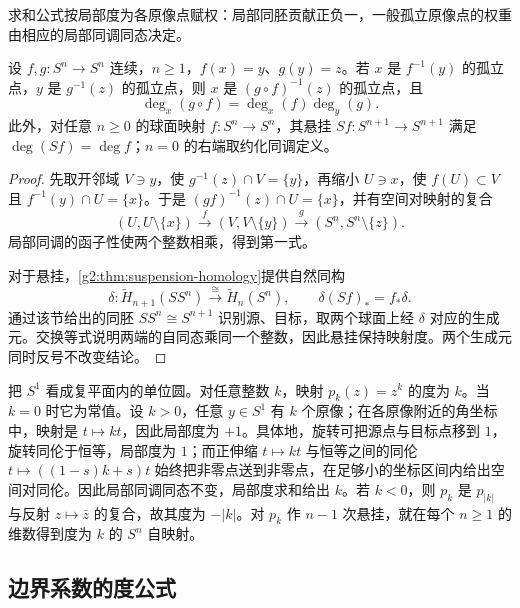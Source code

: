 求和公式按局部度为各原像点赋权：局部同胚贡献正负一，一般孤立原像点的权重由相应的局部同调同态决定。

\begin{proposition}\label{g2:prop:degree-composition-suspension}
	设 \(f,g:S^n\rightarrow S^n\) 连续，\(n\ge1\)，\(f(x)=y\)、\(g(y)=z\)。若 \(x\) 是 \(f^{-1}(y)\) 的孤立点，\(y\) 是 \(g^{-1}(z)\) 的孤立点，则 \(x\) 是 \((g\circ f)^{-1}(z)\) 的孤立点，且
	\[
		\deg_x(g\circ f)=\deg_x(f)\deg_y(g).
	\]
	此外，对任意 \(n\ge0\) 的球面映射 \(f:S^n\rightarrow S^n\)，其悬挂 \(Sf:S^{n+1}\rightarrow S^{n+1}\) 满足 \(\deg(Sf)=\deg f\)；\(n=0\) 的右端取约化同调定义。
\end{proposition}
\begin{proof}
	先取开邻域 \(V\ni y\)，使 \(g^{-1}(z)\cap V=\{y\}\)，再缩小 \(U\ni x\)，使 \(f(U)\subset V\) 且 \(f^{-1}(y)\cap U=\{x\}\)。于是 \((gf)^{-1}(z)\cap U=\{x\}\)，并有空间对映射的复合
	\[
		(U,U\setminus\{x\})\xrightarrow{f}
		(V,V\setminus\{y\})\xrightarrow{g}
		(S^n,S^n\setminus\{z\}).
	\]
	局部同调的函子性使两个整数相乘，得到第一式。

	对于悬挂，\cref{g2:thm:suspension-homology}提供自然同构
	\[
		\delta:\widetilde H_{n+1}(SS^n)\xrightarrow{\cong}\widetilde H_n(S^n),
		\qquad \delta(Sf)_*=f_*\delta.
	\]
	通过该节给出的同胚 \(SS^n\cong S^{n+1}\) 识别源、目标，取两个球面上经 \(\delta\) 对应的生成元。交换等式说明两端的自同态乘同一个整数，因此悬挂保持映射度。两个生成元同时反号不改变结论。
\end{proof}

\begin{example}\label{g2:exm:all-integer-degrees}
	把 \(S^1\) 看成复平面内的单位圆。对任意整数 \(k\)，映射 \(p_k(z)=z^k\) 的度为 \(k\)。当 \(k=0\) 时它为常值。设 \(k>0\)，任意 \(y\in S^1\) 有 \(k\) 个原像；在各原像附近的角坐标中，映射是 \(t\mapsto kt\)，因此局部度为 \(+1\)。具体地，旋转可把源点与目标点移到 \(1\)，旋转同伦于恒等，局部度为 \(1\)；而正伸缩 \(t\mapsto kt\) 与恒等之间的同伦 \(t\mapsto((1-s)k+s)t\) 始终把非零点送到非零点，在足够小的坐标区间内给出空间对同伦。因此局部同调同态不变，局部度求和给出 \(k\)。若 \(k<0\)，则 \(p_k\) 是 \(p_{|k|}\) 与反射 \(z\mapsto\bar z\) 的复合，故其度为 \(-|k|\)。对 \(p_k\) 作 \(n-1\) 次悬挂，就在每个 \(n\ge1\) 的维数得到度为 \(k\) 的 \(S^n\) 自映射。
\end{example}

\subsection{边界系数的度公式}
\label{g2:subsec:0302:03}

